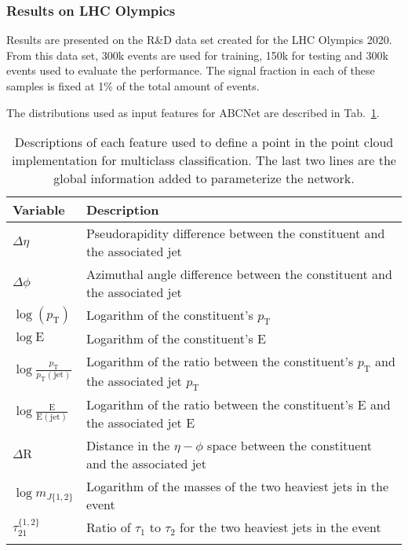 \documentclass[a4paper,11pt]{article}
\begin{document}
\subsubsection{Results on LHC Olympics}
\label{sec:results}

Results are presented on the R\&D data set created for the LHC Olympics 2020. From this data set, 300k events are used for training, 150k for testing and 300k events used to evaluate the performance. The signal fraction in each of these samples is fixed at 1\% of the total amount of events.

The distributions used as input features for ABCNet are described in Tab.~\ref{tab:anomaly_vars}. 

\begin{table}[ht]
    \centering
    \caption{Descriptions of each feature used to define a point in the point cloud implementation for multiclass classification. The last two lines are the global information added to parameterize the network.}
    \label{tab:anomaly_vars}
	\begin{tabular}{ll}
    \hline\noalign{\smallskip} 
             Variable & Description  \\
            \hline
            $\Delta\eta$       &  \small{Pseudorapidity difference between the constituent and the associated jet}\\  
            $\Delta\phi$       &  \small{Azimuthal angle difference between the constituent and the  associated jet}\\  
            $\log(p_\text{T})$       &  \small{Logarithm of the constituent's $p_\text{T}$ }\\  
            $\log\mathrm{E}$       &  \small{Logarithm of the constituent's E }\\  
            $\log\frac{p_\text{T}}{p_\text{T}(\mathrm{jet})}$       &  \small{Logarithm of the ratio between the constituent's $p_\text{T}$ and the associated jet $p_\text{T}$}\\  
            $\log\frac{\mathrm{E}}{\mathrm{E}(\mathrm{jet})}$       &  \small{Logarithm of the ratio between the constituent's E and the associated jet E}\\  
            $\Delta\mathrm{R}$       &  \small{Distance in the $\eta-\phi$ space between the constituent and the associated jet}\\  
            \hline
            $\log m_{J\{1,2\}}$ & \small{Logarithm of the masses of the two heaviest jets in the event} \\
            $\tau_{21}^{\{1,2\}}$ & \small{Ratio of $\tau_1$ to $\tau_2$ for the two heaviest jets in the event}  \\
    \noalign{\smallskip}\hline  
	\end{tabular}
\end{table}
\end{document}

